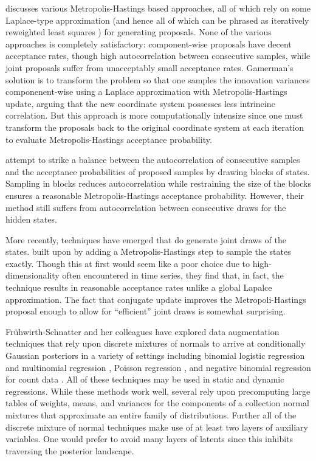 \documentclass[11pt]{article}
\begin{document}
\cite{gamerman-1998} discusses various Metropolis-Hastings based approaches, all
of which rely on some Laplace-type approximation (and hence all of which can be
phrased as iteratively reweighted least squares \citep{wedderburn-1974}) for
generating proposals.  None of the various approaches is completely
satisfactory: component-wise proposals have decent acceptance rates, though high
autocorrelation between consecutive samples, while joint proposals suffer from
unacceptably small acceptance rates.  Gamerman's solution is to transform the
problem so that one samples the innovation variances componenent-wise using a
Laplace approximation with Metropolis-Hastings update, arguing that the new
coordinate system possesses less intrincinc correlation.  But this approach is
more computationally intensize since one must transform the proposals back to
the original coordinate system at each iteration to evaluate Metropolis-Hastings
acceptance probability.

\cite{shephard-pitt-1997} attempt to strike a balance between the
autocorrelation of consecutive samples and the acceptance probabilities of
proposed samples by drawing blocks of states.  Sampling in blocks reduces
autocorrelation while restraining the size of the blocks ensures a reasonable
Metropolis-Hastings acceptance probability.  However, their method still suffers
from autocorrelation between consecutive draws for the hidden states.

More recently, techniques have emerged that do generate joint draws of the
states.  \cite{ravines-etal-2006} built upon \cite{west-etal-1985} by adding a
Metropolis-Hastings step to sample the states exactly.  Though this at first
would seem like a poor choice due to high-dimensionality often encountered in
time series, they find that, in fact, the technique results in reasonable
acceptance rates unlike a global Lapalce approximation.  The fact that conjugate
update improves the Metropoli-Hastings proposal enough to allow for
``efficient'' joint draws is somewhat surprising.

Fr\"{u}hwirth-Schnatter and her colleagues have explored data augmentation
techniques that rely upon discrete mixtures of normals to arrive at
conditionally Gaussian posteriors in a variety of settings including binomial
logistic regression and multinomial regression
\citep{fruhwirth-schnatter-fruhwirth-2007, fruhwirth-schnatter-fruhwirth-2010,
  fussl-etal-2013}, Poisson regression \citep{fruhwirth-schnatter-wagner-2006,
  fruhwirth-schnatter-etal-2009}, and negative binomial regression for count
data \citep{fruhwirth-schnatter-etal-2009}.  All of these techniques may be used
in static and dynamic regressions.  While these methods work well, several rely
upon precomputing large tables of weights, means, and variances for the
components of a collection normal mixtures that approximate an entire family of
distributions.  Further all of the discrete mixture of normal techniques make
use of at least two layers of auxiliary variables.  One would prefer to avoid
many layers of latents since this inhibits traversing the posterior landscape.
\end{document}

